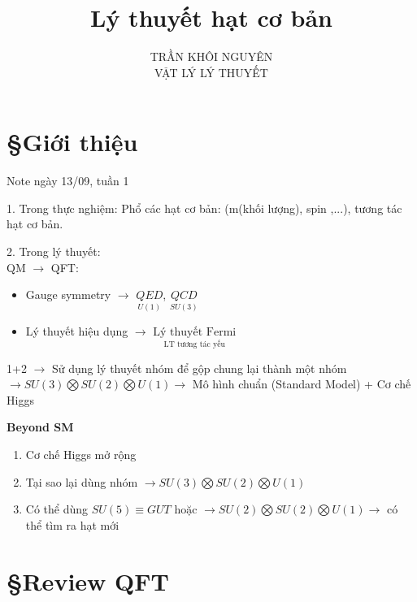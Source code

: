 \documentclass{report}
\title{\Huge{Lý thuyết hạt cơ bản}}
\begin{document}
\setlength{\parindent}{20pt}
\newpage
\author{TRẦN KHÔI NGUYÊN \\ VẬT LÝ LÝ THUYẾT}
\maketitle

\clearpage

\chapter*{\S\quad Giới thiệu}
Note ngày 13/09, tuần 1

1. Trong thực nghiệm: Phổ các hạt cơ bản: (m(khối lượng), spin ,...), tương tác hạt cơ bản.

2. Trong lý thuyết: \\
QM $\rightarrow$ QFT:
\begin{itemize}
	\item Gauge symmetry $\rightarrow$ $\underset{U(1)}{QED}$, $\underset{SU(3)}{QCD}$
	\item Lý thuyết hiệu dụng $\rightarrow$ $\underset{\text{LT tương tác yếu}}{\text{Lý thuyết Fermi}}$
\end{itemize}

1+2 $\rightarrow$ Sử dụng lý thuyết nhóm để gộp chung lại thành một nhóm \\
$\rightarrow SU(3) \bigotimes SU(2) \bigotimes U(1) \rightarrow$ Mô hình chuẩn (Standard Model) + Cơ chế Higgs

\textbf{Beyond SM}
\begin{enumerate}
	\item Cơ chế Higgs mở rộng
	\item Tại sao lại dùng nhóm $\rightarrow SU(3) \bigotimes SU(2) \bigotimes U(1)$
	\item Có thể dùng $SU(5) \equiv GUT$ hoặc $\rightarrow SU(2) \bigotimes SU(2) \bigotimes U(1)\rightarrow$ có thể tìm ra hạt mới
\end{enumerate}
\chapter*{\S\quad Review QFT}
\end{document}
